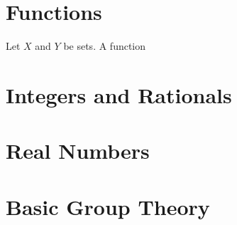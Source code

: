 \documentclass[10pt]{article}
\begin{document}
\section{Functions}
\begin{definition}
    Let $X$ and $Y$ be sets. A function 
\end{definition}




\newpage
\section{Integers and Rationals}
\section{Real Numbers}
\section{Basic Group Theory}
\hindex
\end{document}
